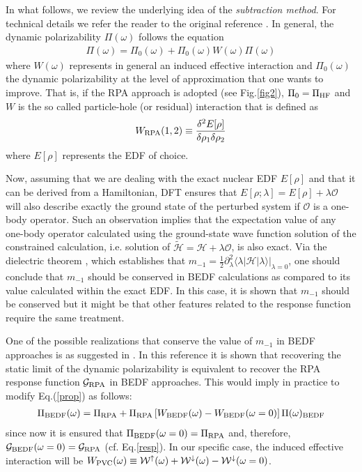 \documentclass[12pt,a4paper,final]{iopart}
\begin{document}
In what follows, we review the underlying idea of the {\it subtraction method}. For technical details we refer the reader to the original reference \cite{tselyaev2013}. In general, the dynamic polarizability $\Pi(\omega)$ follows the equation 
\begin{eqnarray}
\Pi(\omega) = \Pi_0(\omega) + \Pi_0(\omega)W(\omega)\Pi(\omega)
\label{prop}
\end{eqnarray}
where $W(\omega)$ represents in general an induced effective interaction and $\Pi_0(\omega)$ the dynamic polarizability at the level of approximation that one wants to improve. That is, if the RPA approach is adopted (see Fig.\ref{fig2}), $\Pi_0=\Pi_{\rm HF}$ and $W$ is the so called particle-hole (or residual) interaction that is defined as 
\begin{eqnarray}
W_{\rm RPA}(1,2) \equiv \frac{\delta^2E[\rho]}{\delta \rho_1 \delta \rho_2} 
\end{eqnarray}
where $E[\rho]$ represents the EDF of choice.

Now, assuming that we are dealing with the exact nuclear EDF $E[\rho]$ and that it can be derived from a Hamiltonian, DFT ensures that $E[\rho; \lambda] = E[\rho] + \lambda\mathcal{O}$ will also describe exactly the ground state of the perturbed system if $\mathcal{O}$ is a one-body operator. Such an observation implies that the expectation value of any one-body operator calculated using the ground-state wave function solution of the constrained calculation, i.e. solution of $\tilde{\mathcal{H}}=\mathcal{H}+\lambda\mathcal{O}$, is also exact. Via the dielectric theorem \cite{bohigas1979}, which establishes that $m_{-1}=\frac{1}{2} \partial^2_\lambda \langle\lambda\vert\mathcal{H}\vert\lambda\rangle\vert_{\lambda=0}$, one should conclude that $m_{-1}$ should be conserved in BEDF calculations as compared to its value calculated within the exact EDF. In this case, it is shown that $m_{-1}$ should be conserved but it might be that other features related to the response function require the same treatment.   

One of the possible realizations that conserve the value of $m_{-1}$ in BEDF approaches is as suggested in \cite{tselyaev2013}. In this reference it is shown that recovering the static limit of the dynamic polarizability is equivalent to recover the RPA response function $\mathcal{G}_{\rm RPA}$ in BEDF approaches. This would imply in practice to modify Eq.(\ref{prop}) as follows:
\begin{eqnarray}
\Pi_{\rm BEDF}(\omega) = \Pi_{\rm RPA} + \Pi_{\rm RPA}\left[W_{\rm BEDF}(\omega)-W_{\rm BEDF}(\omega=0)\right]\Pi(\omega)_{\rm BEDF}  
\end{eqnarray}
since now it is ensured that $\Pi_{\rm BEDF}(\omega=0) = \Pi_{\rm RPA}$ and, therefore, $\mathcal{G}_{\rm BEDF}(\omega=0)=\mathcal{G}_{\rm RPA}$ (cf. Eq.\ref{resp}). In our specific case, the induced effective interaction will be $W_{\rm PVC}(\omega)\equiv \mathcal{W}^\uparrow(\omega)+\mathcal{W}^\downarrow(\omega)-\mathcal{W}^\downarrow(\omega=0)$.
\end{document}
